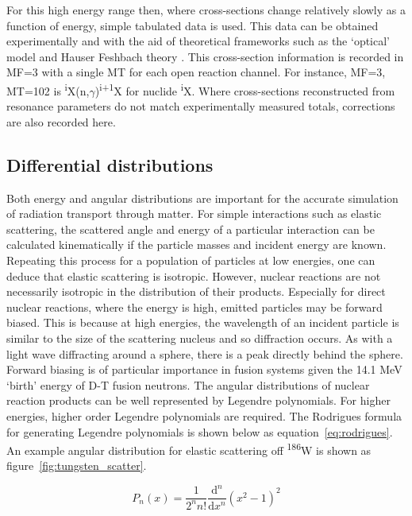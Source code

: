 For this high energy range then, where cross-sections change relatively slowly as a function of energy, simple tabulated data is used. This data can be obtained experimentally and with the aid of theoretical frameworks such as the `optical' model and Hauser Feshbach theory \cite{Hauser1952}. This cross-section information is recorded in MF=3 with a single MT for each open reaction channel. For instance, MF=3, MT=102 is \textsuperscript{i}X(n,$\gamma$)\textsuperscript{i+1}X for nuclide \textsuperscript{i}X. Where cross-sections reconstructed from resonance parameters do not match experimentally measured totals, corrections are also recorded here.

\subsection{Differential distributions}
Both energy and angular distributions are important for the accurate simulation of radiation transport through matter. For simple interactions such as elastic scattering, the scattered angle and energy of a particular interaction can be calculated kinematically if the particle masses and incident energy are known. Repeating this process for a population of particles at low energies, one can deduce that elastic scattering is isotropic. However, nuclear reactions are not necessarily isotropic in the distribution of their products. Especially for direct nuclear reactions, where the energy is high, emitted particles may be forward biased. This is because at high energies, the wavelength of an incident particle is similar to the size of the scattering nucleus and so diffraction occurs. As with a light wave diffracting around a sphere, there is a peak directly behind the sphere. Forward biasing is of particular importance in fusion systems given the 14.1 MeV `birth' energy of D-T fusion neutrons. The angular distributions of nuclear reaction products can be well represented by Legendre polynomials. For higher energies, higher order Legendre polynomials are required. The Rodrigues formula for generating Legendre polynomials is shown below as equation~\ref{eq:rodrigues}. An example angular distribution for elastic scattering off \textsuperscript{186}W is shown as figure~\ref{fig:tungsten_scatter}.

\begin{equation}
  P_{n}(x) = \frac{1}{2^{n}n!} \frac{\mathrm{d}^{n}}{\mathrm{d}x^{n}} (x^{2} - 1)^{2}
  \label{eq:rodrigues}
\end{equation}

